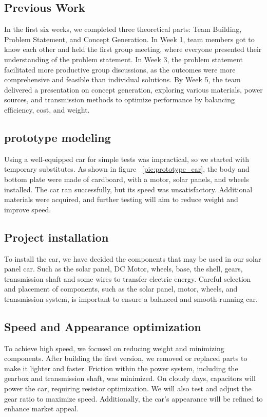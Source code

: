 \documentclass[12pt]{article}
\begin{document}
\subsection{Previous Work}
In the first six weeks, we completed three theoretical parts: Team Building, Problem Statement, and Concept Generation. In Week 1, team members got to know each other and held the first group meeting, where everyone presented their understanding of the problem statement. In Week 3, the problem statement facilitated more productive group discussions, as the outcomes were more comprehensive and feasible than individual solutions. By Week 5, the team delivered a presentation on concept generation, exploring various materials, power sources, and transmission methods to optimize performance by balancing efficiency, cost, and weight.
\subsection{prototype modeling}
Using a well-equipped car for simple tests was impractical, so we started with temporary substitutes. 
As shown in figure  ~\ref{pic:prototype_car}, the body and bottom plate were made of cardboard, with a motor, solar panels, and wheels installed. 
The car ran successfully, but its speed was unsatisfactory. 
Additional materials were acquired, and further testing will aim to reduce weight and improve speed.

\subsection{Project installation}
\label{sec:installation}
To install the car, we have decided the components that may be used in our solar panel car.
Such as the solar panel, DC Motor, wheels, base, the shell, gears, transmission shaft and some wires to transfer electric energy. 
Careful selection and placement of components, such as the solar panel, motor, wheels, and transmission system, is important to ensure a balanced and smooth-running car\cite{Hapuwatte2017}. 
\subsection{Speed and Appearance optimization}
\label{sec:Optimization}  
To achieve high speed, we focused on reducing weight and minimizing components. After building the first version, we removed or replaced parts to make it lighter and faster. 
Friction within the power system, including the gearbox and transmission shaft, was minimized. 
On cloudy days, capacitors will power the car, requiring resistor optimization. 
We will also test and adjust the gear ratio to maximize speed. Additionally, the car's appearance will be refined to enhance market appeal.
\end{document}
